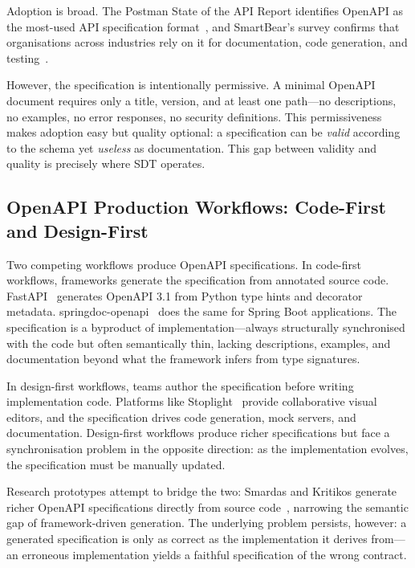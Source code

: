 Adoption is broad. The Postman State of the API Report identifies OpenAPI as the most-used API specification format~\cite{postman-state-of-api}, and SmartBear's survey confirms that organisations across industries rely on it for documentation, code generation, and testing~\cite{smartbear-api-report}.

However, the specification is intentionally permissive. A minimal OpenAPI document requires only a title, version, and at least one path---no descriptions, no examples, no error responses, no security definitions. This permissiveness makes adoption easy but quality optional: a specification can be \textit{valid} according to the schema yet \textit{useless} as documentation. This gap between validity and quality is precisely where SDT operates.

\subsection{OpenAPI Production Workflows: Code-First and Design-First}
\label{subsec:code-first-design-first}

Two competing workflows produce OpenAPI specifications. In code-first workflows, frameworks generate the specification from annotated source code. FastAPI~\cite{fastapi} generates OpenAPI 3.1 from Python type hints and decorator metadata. springdoc-openapi~\cite{springdoc} does the same for Spring Boot applications. The specification is a byproduct of implementation---always structurally synchronised with the code but often semantically thin, lacking descriptions, examples, and documentation beyond what the framework infers from type signatures.

In design-first workflows, teams author the specification before writing implementation code. Platforms like Stoplight~\cite{stoplight} provide collaborative visual editors, and the specification drives code generation, mock servers, and documentation. Design-first workflows produce richer specifications but face a synchronisation problem in the opposite direction: as the implementation evolves, the specification must be manually updated.

Research prototypes attempt to bridge the two: Smardas and Kritikos generate richer OpenAPI specifications directly from source code~\cite{smardas2025openapi}, narrowing the semantic gap of framework-driven generation. The underlying problem persists, however: a generated specification is only as correct as the implementation it derives from---an erroneous implementation yields a faithful specification of the wrong contract.

